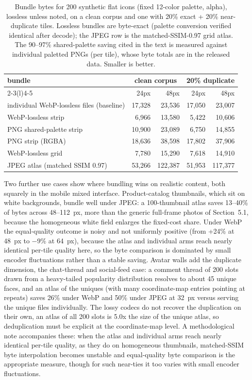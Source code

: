 \documentclass[3p,twocolumn]{elsarticle}
\begin{document}
\begin{table}[t]
\centering
\footnotesize
\setlength{\tabcolsep}{4pt}
\begin{tabular}{@{}l rrrr@{}}
\toprule
bundle & \multicolumn{2}{c}{clean corpus} & \multicolumn{2}{c}{20\% duplicate} \\ \cmidrule(l){2-3}\cmidrule(l){4-5}
& 24px & 48px & 24px & 48px \\
\midrule
individual WebP-lossless files (baseline) & 17,328 & 23,536 & 17,050 & 23,007 \\
WebP-lossless strip & 6,966 & 13,580 & 5,422 & 10,606 \\
PNG shared-palette strip & 10,900 & 23,089 & 6,750 & 14,855 \\
PNG strip (RGBA) & 18,636 & 38,598 & 17,802 & 37,906 \\
WebP-lossless grid & 7,780 & 15,290 & 7,618 & 14,910 \\
JPEG atlas (matched SSIM 0.97) & 53,266 & 122,387 & 51,953 & 117,377 \\
\bottomrule
\end{tabular}
\caption{Bundle bytes for 200 synthetic flat icons (fixed
12-color palette, alpha), lossless unless noted, on a clean corpus and
one with 20\% exact + 20\% near-duplicate tiles. Lossless bundles are
byte-exact (palette conversion verified identical after decode); the
JPEG row is the matched-SSIM-0.97 grid atlas. The 90--97\%
shared-palette saving cited in the text is measured against individual
paletted PNGs (per tile), whose byte totals are in the released data.
Smaller is better.}

\end{table}


Two further use cases show where bundling wins on realistic content,
both squarely in the mobile mixed interface. Product-catalog thumbnails,
which sit on white backgrounds, bundle well under JPEG: a 100-thumbnail
atlas saves 13--40\% of bytes across 48--112~px, more than the generic
full-frame photos of Section~5.1, because the homogeneous white field
enlarges the fixed-cost share. Under WebP the equal-quality outcome is
noisy and not uniformly positive (from +24\% at 48~px to −9\% at 64~px),
because the atlas and individual arms reach nearly identical per-tile
quality here, so the byte comparison is dominated by small encoder
fluctuations rather than a stable saving. Avatar walls add the duplicate
dimension, the chat-thread and social-feed case: a comment thread of 200
slots drawn from a heavy-tailed popularity distribution resolves to
about 45 unique faces, and an atlas of the uniques (with many
coordinate-map entries pointing at repeats) saves 26\% under WebP and
50\% under JPEG at 32~px versus serving the unique files individually.
The lossy codecs do not recover the duplication on their own, an atlas
of all 200 slots is 5.0x the size of the unique atlas, so deduplication
must be explicit at the coordinate-map level. A methodological note
accompanies these: when the atlas and individual arms reach nearly
identical per-tile quality, as they do on homogeneous thumbnails,
matched-SSIM byte interpolation becomes unstable and equal-quality byte
comparison is the appropriate measure, though for such near-ties it too
varies with small encoder fluctuations.
\end{document}

